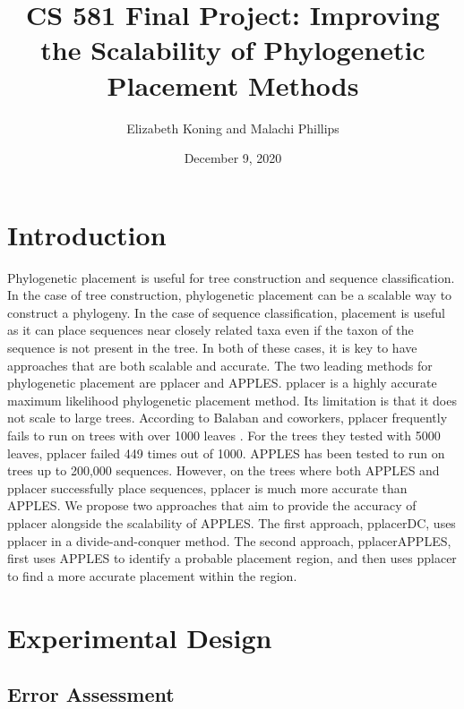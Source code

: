 \documentclass[10pt]{article}
\title{CS 581 Final Project: Improving the Scalability of Phylogenetic Placement Methods}
\author{Elizabeth Koning and Malachi Phillips}
\date{December 9, 2020}
\begin{document}
\vspace{-1cm}
\maketitle

\section{Introduction}

Phylogenetic placement is useful for tree construction and sequence classification. In the case of tree construction, phylogenetic placement can be a scalable way to construct a phylogeny. In the case of sequence classification, placement is useful as it can place sequences near closely related taxa even if the taxon of the sequence is not present in the tree. In both of these cases, it is key to have approaches that are both scalable and accurate.
The two leading methods for phylogenetic placement are pplacer and APPLES. pplacer \cite{matsen_pplacer_2010} is a highly accurate maximum likelihood phylogenetic placement method. Its limitation is that it does not scale to large trees. According to Balaban and coworkers,  pplacer frequently fails to run on trees with over 1000 leaves \cite{balaban_apples_2020}.
For the trees they tested with 5000 leaves, pplacer failed 449 times out of 1000. APPLES has been tested to run on trees up to 200,000 sequences. However, on the trees where both APPLES and pplacer successfully place sequences, pplacer is much more accurate than APPLES.
We propose two approaches that aim to provide the accuracy of pplacer alongside the scalability of APPLES. The first approach, pplacerDC, uses pplacer in a divide-and-conquer method. The second approach, pplacerAPPLES, first uses APPLES to identify a probable placement region, and then uses pplacer to find a more accurate placement within the region.

\section{Experimental Design}



\subsection{Error Assessment}
\end{document}

